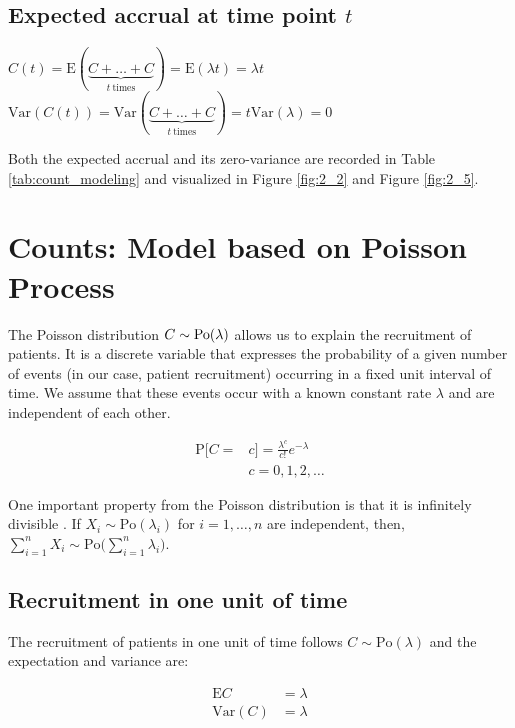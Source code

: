\subsection{Expected accrual at time point $t$}
$C(t) = \textrm{E}(\underbrace{C+\ldots+C}_{t \ \text{times}}) = \textrm{E}(\lambda t) = \lambda t$\\
$\textrm{Var}(C(t)) = \textrm{Var}(\underbrace{C+\ldots+C}_{t \ \text{times}}) = t \textrm{Var}(\lambda) = 0$

Both the expected accrual and its zero-variance are recorded in Table \ref{tab:count_modeling}
and visualized in Figure \ref{fig:2_2} and Figure \ref{fig:2_5}.



\section{Counts: Model based on Poisson Process}

The Poisson distribution $C\sim \rm{Po} (\lambda)$ allows us to explain the recruitment of patients. It is a discrete variable that expresses the probability of a given number of events (in our case, patient recruitment) occurring in a fixed unit interval of time. We assume that these events occur with a known constant rate $\lambda$ and are independent of each other.

\begin{align*}
\textrm{P}[C=&c] = \frac{\lambda^c}{c!}e^{-\lambda} \\
&c = 0,1,2,\ldots
\end{align*}


One important property from the Poisson distribution is that it is infinitely divisible \citep{held2014applied}. If $X_i\sim \textrm{Po} (\lambda_i)$ for $i=1,\ldots, n$ are independent, then, $\sum_{i=1}^n X_i \sim \textrm{Po} \Big( \sum_{i=1}^n \lambda_i \Big)$.

\subsection{Recruitment in one unit of time}

The recruitment of patients in one unit of time follows $C\sim \textrm{Po} (\lambda)$ and the expectation and variance are:

\begin{align*}
\textrm{E}C & = \lambda \\
\textrm{Var}(C) & = \lambda
\end{align*}

